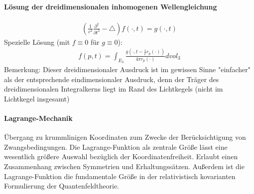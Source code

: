 \documentclass[10pt,a4paper]{article}
\begin{document}
\paragraph{Lösung der dreidimensionalen inhomogenen Wellengleichung} $\,$ \\
\begin{align}
( \frac{1}{c^2} \frac{\partial^2}{\partial t^2}-\triangle) f(\cdot, t)= g(\cdot, t)
\end{align}
Spezielle Lösung (mit $f\equiv 0$ für $g \equiv 0$):
\begin{align}
f(p,t)=\int_{E_3} \frac{g(\cdot, t-\frac{1}{c}r_p (\cdot))}{4 \pi r_p(\cdot)} dvol_3
\end{align}
Bemerkung: Dieser dreidimensionaler Ausdruck ist im gewissen Sinne "einfacher" als der entsprechende eindimensionaler Ausdruck, denn der Träger des dreidimensionalen Integralkerns liegt im Rand des Lichtkegels (nicht im Lichtkegel insgesamt)  
\paragraph{Lagrange-Mechanik} $\,$ \\
Übergang zu krummlinigen Koordinaten zum Zwecke der Berücksichtigung von Zwangsbedingungen. Die Lagrange-Funktion als zentrale Größe lässt eine wesentlich größere Auswahl bezüglich der Koordinatenfreiheit. Erlaubt einen Zusammenhang zwischen Symmetrien und Erhaltungssätzen. Außerdem ist die Lagrange-Funktion die fundamentale Größe in der relativistisch kovarianten Formulierung der Quantenfeldtheorie.
\end{document}
